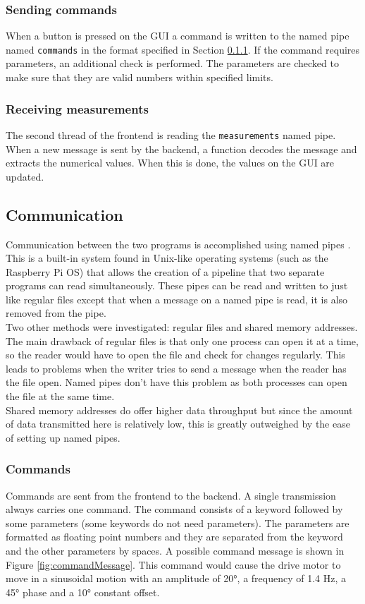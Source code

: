 \documentclass[12pt]{article}
\begin{document}
\subsubsection{Sending commands}
When a button is pressed on the GUI a command is written to the named pipe named \verb|commands| in the format specified in Section \ref{sec:commands}. If the command requires parameters, an additional check is performed. The parameters are checked to make sure that they are valid numbers within specified limits.

\subsubsection{Receiving measurements}
The second thread of the frontend is reading the \verb|measurements| named pipe. When a new message is sent by the backend, a function decodes the message and extracts the numerical values. When this is done, the values on the GUI are updated.

\subsection{Communication}
Communication between the two programs is accomplished using named pipes \cite{MKFIFO}. This is a built-in system found in Unix-like operating systems (such as the Raspberry Pi OS) that allows the creation of a pipeline that two separate programs can read simultaneously. These pipes can be read and written to just like regular files except that when a message on a named pipe is read, it is also removed from the pipe.\\

Two other methods were investigated: regular files and shared memory addresses. The main drawback of regular files is that only one process can open it at a time, so the reader would have to open the file and check for changes regularly. This leads to problems when the writer tries to send a message when the reader has the file open. Named pipes don't have this problem as both processes can open the file at  the same time.\\

Shared memory addresses do offer higher data throughput but since the amount of data transmitted here is relatively low, this is greatly outweighed by the ease of setting up named pipes. 


\subsubsection{Commands}
\label{sec:commands}
Commands are sent from the frontend to the backend. A single transmission always carries one command. The command consists of a keyword followed by some parameters (some keywords do not need parameters). The parameters are formatted as floating point numbers and they are separated from the keyword and the other parameters by spaces. A possible command message is shown in Figure \ref{fig:commandMessage}. This command would cause the drive motor to move in a sinusoidal motion with an amplitude of 20°, a frequency of 1.4 Hz, a 45° phase and a 10° constant offset.\\
\end{document}
